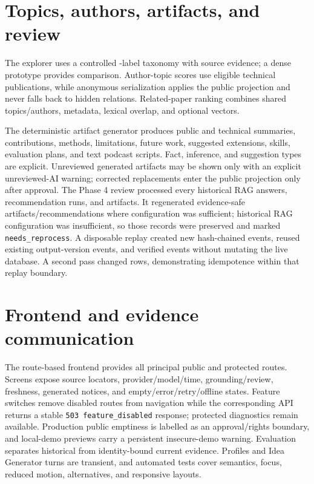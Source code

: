 \section{Topics, authors, artifacts, and review}

The explorer uses a controlled \TopicVocabularyCount{}-label taxonomy with source evidence; a dense prototype provides comparison. Author-topic scores use eligible technical publications, while anonymous serialization applies the public projection and never falls back to hidden relations. Related-paper ranking combines shared topics/authors, metadata, lexical overlap, and optional vectors.

The deterministic artifact generator produces public and technical summaries, contributions, methods, limitations, future work, suggested extensions, skills, evaluation plans, and text podcast scripts. Fact, inference, and suggestion types are explicit. Unreviewed generated artifacts may be shown only with an explicit unreviewed-AI warning; corrected replacements enter the public projection only after approval. The Phase 4 review processed every \GeneratedRagAnswerCount{} historical RAG answers, \GeneratedRecommendationCount{} recommendation runs, and \GeneratedArtifactCount{} artifacts. It regenerated evidence-safe artifacts/recommendations where configuration was sufficient; historical RAG configuration was insufficient, so those \GeneratedNeedsReprocessCount{} records were preserved and marked \texttt{needs\_reprocess}. A disposable replay created \GeneratedReviewEventCount{} new hash-chained events, reused \GeneratedReviewReusedCount{} existing output-version events, and verified \GeneratedReviewVerifiedEventCount{} events without mutating the live database. A second pass changed \GeneratedReviewSecondPassChangedCount{} rows, demonstrating idempotence within that replay boundary.

\section{Frontend and evidence communication}

The route-based frontend provides all principal public and protected routes. Screens expose source locators, provider/model/time, grounding/review, freshness, generated notices, and empty/error/retry/offline states. Feature switches remove disabled routes from navigation while the corresponding API returns a stable \texttt{503 feature\_disabled} response; protected diagnostics remain available. Production public emptiness is labelled as an approval/rights boundary, and local-demo previews carry a persistent insecure-demo warning. Evaluation separates historical from identity-bound current evidence. Profiles and Idea Generator turns are transient, and automated tests cover semantics, focus, reduced motion, alternatives, and responsive layouts.

